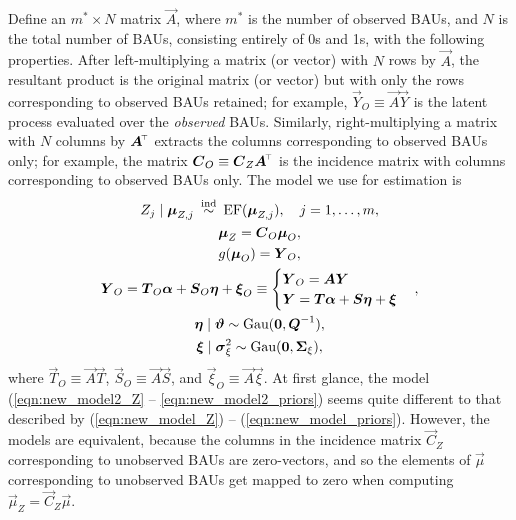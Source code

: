 \documentclass[12pt,a4paper]{article}
\begin{document}
\begin{appendices}
Define an $m^* \times N$ matrix $\vec{A}$, where $m^*$ is the number of observed BAUs, and $N$ is the total number of BAUs, consisting entirely of 0s and 1s, with the following properties. 
After left-multiplying a matrix (or vector) with $N$ rows by $\vec{A}$, the resultant product is the original matrix (or vector) but with only the rows corresponding to observed BAUs retained; for example, $\vec{Y}_O \equiv \vec{A}\vec{Y}$ is the latent process evaluated over the \textit{observed} BAUs.
Similarly, right-multiplying a matrix with $N$ columns by $\vec{A}^\tp$ extracts the columns corresponding to observed BAUs only; for example, the matrix $\vec{C}_O \equiv \vec{C}_Z\vec{A}^\tp$ is the incidence matrix with columns corresponding to observed BAUs only.
The model we use for estimation is
\begin{gather}
    Z_j \mid \vec{\mu}_{Z,j} \inddist \text{EF}(\vec{\mu}_{Z,j}), \quad j = 1, \dots, m,  \label{eqn:new_model2_Z}\\
    \vec{\mu}_Z = \vec{C}_O \vec{\mu}_O,\\
    g(\vec{\mu}_O) = \vec{Y}_O, \\
    \vec{Y}_O = \vec{T}_O \vec{\alpha} + \vec{S}_O \vec{\eta} + \vec{\xi}_O \equiv 
    \begin{cases} 
    \vec{Y}_O = \vec{A}\vec{Y}\\
    \vec{Y} = \vec{T} \vec{\alpha} + \vec{S} \vec{\eta} + \vec{\xi} \\
    \end{cases},\\
    \vec{\eta} \mid \vec{\vartheta} \sim \Gau(\vec{0}, \vec{Q}^{-1}), \\
    \vec{\xi} \mid \vec{\sigma}^2_\xi \sim \Gau(\vec{0}, \vec{\Sigma}_\xi), \label{eqn:new_model2_priors}
\end{gather}
where $\vec{T}_O \equiv \vec{A} \vec{T}$, $\vec{S}_O \equiv \vec{A} \vec{S}$, and $\vec{\xi}_O \equiv \vec{A} \vec{\xi}$.
At first glance, the model (\ref{eqn:new_model2_Z} -- \ref{eqn:new_model2_priors}) seems quite different to that described by (\ref{eqn:new_model_Z}) -- (\ref{eqn:new_model_priors}). 
However, the models are equivalent, because the columns in the incidence matrix $\vec{C}_Z$ corresponding to unobserved BAUs are zero-vectors, and so the elements of $\vec{\mu}$ corresponding to unobserved BAUs get mapped to zero when computing $\vec{\mu}_Z = \vec{C}_Z \vec{\mu}$.

\end{appendices}
\end{document}
